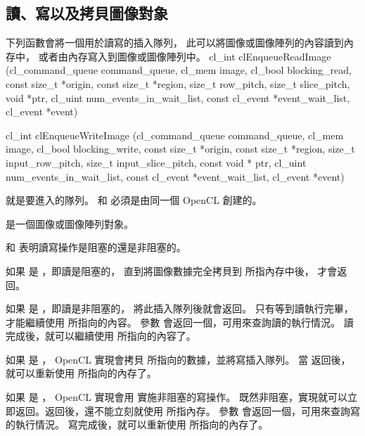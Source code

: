\subsection{讀、寫以及拷貝圖像對象}

下列函數會將一個用於讀寫的插入隊列，
此可以將圖像或圖像陣列的內容讀到內存中，
或者由內存寫入到圖像或圖像陣列中。
\startclc
cl_int clEnqueueReadImage (cl_command_queue command_queue,
			cl_mem image,
			cl_bool blocking_read,
			const size_t *origin,
			const size_t *region,
			size_t row_pitch,
			size_t slice_pitch,
			void *ptr,
			cl_uint num_events_in_wait_list,
			const cl_event *event_wait_list,
			cl_event *event)

cl_int clEnqueueWriteImage (cl_command_queue command_queue,
			cl_mem image,
			cl_bool blocking_write,
			const size_t *origin,
			const size_t *region,
			size_t input_row_pitch,
			size_t input_slice_pitch,
			const void * ptr,
			cl_uint num_events_in_wait_list,
			const cl_event *event_wait_list,
			cl_event *event)
\stopclc

 就是要進入的隊列。
 和  必須是由同一個 OpenCL 創建的。

 是一個圖像或圖像陣列對象。

 和  表明讀寫操作是{\ftRef 阻塞}的還是{\ftRef 非阻塞}的。

如果  是 ，即讀是阻塞的，
直到將圖像數據完全拷貝到  所指內存中後，  才會返回。

如果  是 ，即讀是非阻塞的，  將此插入隊列後就會返回。
只有等到讀執行完畢，才能繼續使用  所指向的內容。
參數  會返回一個，可用來查詢讀的執行情況。
讀完成後，就可以繼續使用  所指向的內容了。

如果  是 ， OpenCL 實現會拷貝  所指向的數據，並將寫插入隊列。
當  返回後，就可以重新使用  所指向的內存了。

如果  是 ， OpenCL 實現會用  實施非阻塞的寫操作。
既然非阻塞，實現就可以立即返回。返回後，還不能立刻就使用  所指內存。
參數  會返回一個，可用來查詢寫的執行情況。
寫完成後，就可以重新使用  所指向的內存了。


